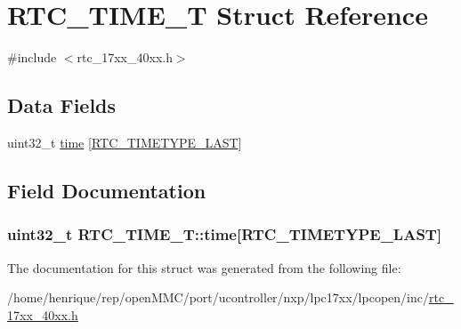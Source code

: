 \hypertarget{structRTC__TIME__T}{\section{R\-T\-C\-\_\-\-T\-I\-M\-E\-\_\-\-T Struct Reference}
\label{structRTC__TIME__T}
}


{\ttfamily \#include $<$rtc\-\_\-17xx\-\_\-40xx.\-h$>$}

\subsection*{Data Fields}
\begin{DoxyCompactItemize}
\item 
uint32\-\_\-t \hyperlink{structRTC__TIME__T_ac45cc767fc67da10dedd9834caf783e6}{time} \mbox{[}\hyperlink{group__RTC__17XX__40XX_gga8144898fe628404d396db06dc8aac0e0a0d4fafef57b6ef363f9a0875ff339cad}{R\-T\-C\-\_\-\-T\-I\-M\-E\-T\-Y\-P\-E\-\_\-\-L\-A\-S\-T}\mbox{]}
\end{DoxyCompactItemize}


\subsection{Field Documentation}
\hypertarget{structRTC__TIME__T_ac45cc767fc67da10dedd9834caf783e6}{
\subsubsection[{time}]{\setlength{\rightskip}{0pt plus 5cm}uint32\-\_\-t R\-T\-C\-\_\-\-T\-I\-M\-E\-\_\-\-T\-::time\mbox{[}{\bf R\-T\-C\-\_\-\-T\-I\-M\-E\-T\-Y\-P\-E\-\_\-\-L\-A\-S\-T}\mbox{]}}}\label{structRTC__TIME__T_ac45cc767fc67da10dedd9834caf783e6}


The documentation for this struct was generated from the following file\-:\begin{DoxyCompactItemize}
\item 
/home/henrique/rep/open\-M\-M\-C/port/ucontroller/nxp/lpc17xx/lpcopen/inc/\hyperlink{rtc__17xx__40xx_8h}{rtc\-\_\-17xx\-\_\-40xx.\-h}\end{DoxyCompactItemize}
